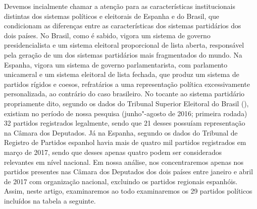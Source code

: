 Devemos incialmente chamar a atenção para as características
institucionais distintas dos sistemas políticos e eleitorais de Espanha
e do Brasil, que condicionam as diferenças entre as características dos
sistemas partidários dos dois países. No Brasil, como é sabido, vigora
um sistema de governo presidencialista e um sistema eleitoral
proporcional de lista aberta, responsável pela geração de um dos
sistemas partidários mais fragmentados do mundo. Na Espanha, vigora um
sistema de governo parlamentarista, com parlamento unicameral e um
sistema eleitoral de lista fechada, que produz um sistema de partidos
rígidos e coesos, refratários a uma representação política
excessivamente personalizada, ao contrário do caso brasileiro. No
tocante ao sistema partidário propriamente dito, segundo os dados do
Tribunal Superior Eleitoral do Brasil (), existiam no período de
nossa pesquisa (junho"-agosto de 2016; primeira rodada) 32 partidos
registrados legalmente, sendo que 21 desses possuíam representação na
Câmara dos Deputados. Já na Espanha, segundo os dados do Tribunal de
Registro de Partidos espanhol havia mais de quatro mil partidos
registrados em março de 2017, sendo que desses apenas quatro podem ser
considerados relevantes em nível nacional. Em nossa análise, nos
concentraremos apenas nos partidos presentes nas Câmara dos Deputados
dos dois países entre janeiro e abril de 2017 com organização nacional,
excluindo os partidos regionais espanhóis. Assim, neste artigo,
examinaremos ao todo examinaremos os 29 partidos políticos incluídos na
tabela a seguinte.


